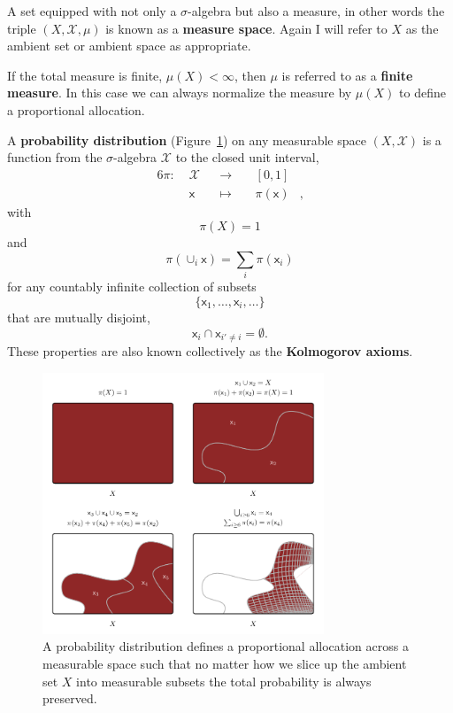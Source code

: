 \documentclass[
  letterpaper,
  DIV=11,
  numbers=noendperiod]{scrartcl}
\begin{document}
A set equipped with not only a \(\sigma\)-algebra but also a measure, in
other words the triple \((X, \mathcal{X}, \mu)\) is known as a
\textbf{measure space}. Again I will refer to \(X\) as the ambient set
or ambient space as appropriate.

If the total measure is finite, \(\mu(X) < \infty\), then \(\mu\) is
referred to as a \textbf{finite measure}. In this case we can always
normalize the measure by \(\mu(X)\) to define a proportional allocation.

A \textbf{probability distribution} (Figure~\ref{fig-distribution}) on
any measurable space \((X, \mathcal{X})\) is a function from the
\(\sigma\)-algebra \(\mathcal{X}\) to the closed unit interval,
\begin{alignat*}{6}
\pi :\; & \mathcal{X} & &\rightarrow& \; & [0, 1] &
\\
& \mathsf{x} & &\mapsto& & \pi(\mathsf{x}) &,
\end{alignat*} with \[
\pi(X) = 1
\] and \[
\pi( \cup_{i} \mathsf{x} ) = \sum_{i} \pi( \mathsf{x}_{i} )
\] for any countably infinite collection of subsets \[
\{ \mathsf{x}_{1}, \ldots, \mathsf{x}_{i}, \ldots \}
\] that are mutually disjoint, \[
\mathsf{x}_{i} \cap \mathsf{x}_{i' \ne i} = \emptyset.
\] These properties are also known collectively as the
\textbf{Kolmogorov axioms}.

\begin{figure}

{\centering \includegraphics[width=0.75\textwidth,height=\textheight]{figures/distribution/distribution.pdf}

}

\caption{\label{fig-distribution}A probability distribution defines a
proportional allocation across a measurable space such that no matter
how we slice up the ambient set \(X\) into measurable subsets the total
probability is always preserved.}

\end{figure}
\end{document}
